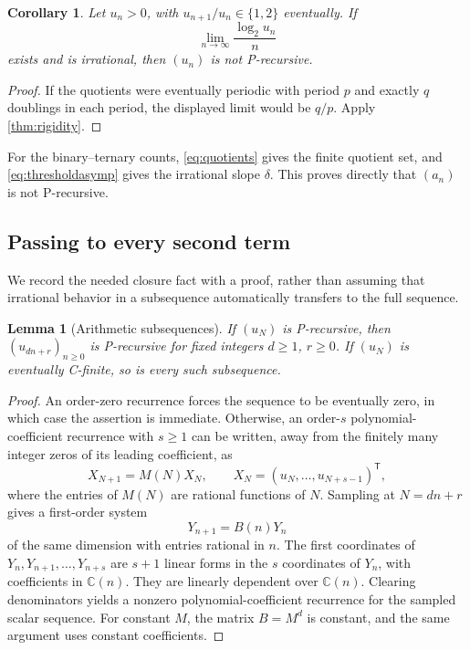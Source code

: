 \documentclass[11pt,letterpaper]{article}
\numberwithin{equation}{section}
\newtheorem{lemma}[lemma]{Lemma}
\newtheorem{corollary}[corollary]{Corollary}
\theoremstyle{definition}
\theoremstyle{remark}
\newcommand{\C}{\mathbb C}
\begin{document}
\begin{corollary}\label{cor:slope}
Let $u_n>0$, with $u_{n+1}/u_n\in\{1,2\}$ eventually. If
\[
 \lim_{n\to\infty}\frac{\log_2u_n}{n}
\]
exists and is irrational, then $(u_n)$ is not P-recursive.
\end{corollary}
\begin{proof}
If the quotients were eventually periodic with period $p$ and exactly $q$ doublings in each period, the displayed limit would be $q/p$. Apply \cref{thm:rigidity}.
\end{proof}

For the binary--ternary counts, \eqref{eq:quotients} gives the finite quotient set, and \eqref{eq:thresholdasymp} gives the irrational slope $\delta$. This proves directly that $(a_n)$ is not P-recursive.

\subsection{Passing to every second term}
We record the needed closure fact with a proof, rather than assuming that irrational behavior in a subsequence automatically transfers to the full sequence.

\begin{lemma}[Arithmetic subsequences]\label{lem:decimation}
If $(u_N)$ is P-recursive, then $(u_{dn+r})_{n\ge0}$ is P-recursive for fixed integers $d\ge1$, $r\ge0$. If $(u_N)$ is eventually C-finite, so is every such subsequence.
\end{lemma}
\begin{proof}
An order-zero recurrence forces the sequence to be eventually zero, in which case the assertion is immediate. Otherwise, an order-$s$ polynomial-coefficient recurrence with $s\ge1$ can be written, away from the finitely many integer zeros of its leading coefficient, as
\[
 X_{N+1}=M(N)X_N,
 \qquad X_N=(u_N,\ldots,u_{N+s-1})^{\mathsf T},
\]
where the entries of $M(N)$ are rational functions of $N$. Sampling at $N=dn+r$ gives a first-order system
\[
 Y_{n+1}=B(n)Y_n
\]
of the same dimension with entries rational in $n$. The first coordinates of $Y_n,Y_{n+1},\ldots,Y_{n+s}$ are $s+1$ linear forms in the $s$ coordinates of $Y_n$, with coefficients in $\C(n)$. They are linearly dependent over $\C(n)$. Clearing denominators yields a nonzero polynomial-coefficient recurrence for the sampled scalar sequence. For constant $M$, the matrix $B=M^d$ is constant, and the same argument uses constant coefficients.
\end{proof}
\end{document}
